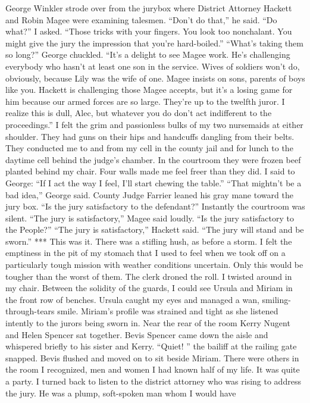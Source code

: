 \documentclass{novel}
\begin{document}
\begin{ChapterStart}

\vspace{3\nbs}
\end{ChapterStart}


George Winkler strode over from the jurybox where District Attorney Hackett and Robin Magee were examining talesmen. “Don’t do that,” he said. “Do what?” I asked. “Those tricks with your fingers. You look too nonchalant. You might give the jury the impression that you’re hard-boiled.” “What’s taking them so long?” George chuckled. “It’s a delight to see Magee work. He’s challenging everybody who hasn’t at least one son in the service. Wives of soldiers won’t do, obviously, because Lily was the wife of one. Magee insists on sons, parents of boys like you. Hackett is challenging those Magee accepts, but it’s a losing game for him because our armed forces are so large. They’re up to the twelfth juror. I realize this is dull, Alec, but whatever you do don’t act indifferent to the proceedings.” I felt the grim and passionless bulks of my two nursemaids at either shoulder. They had guns on their hips and handcuffs dangling from their belts. They conducted me to and from my cell in the county jail and for lunch to the daytime cell behind the judge’s chamber. In the courtroom they were frozen beef planted behind my chair. Four walls made me feel freer than they did. I said to George: “If I act the way I feel, I’ll start chewing the table.” “That mightn’t be a bad idea,” George said. County Judge Farrier leaned his gray mane toward the jury box. “Is the jury satisfactory to the defendant?” Instantly the courtroom was silent. “The jury is satisfactory,” Magee said loudly. “Is the jury satisfactory to the People?” “The jury is satisfactory,” Hackett said. “The jury will stand and be sworn.” *** This was it. There was a stifling hush, as before a storm. I felt the emptiness in the pit of my stomach that I used to feel when we took off on a particularly tough mission with weather conditions uncertain. Only this would be tougher than the worst of them. The clerk droned the roll. I twisted around in my chair. Between the solidity of the guards, I could see Ursula and Miriam in the front row of benches. Ursula caught my eyes and managed a wan, smiling-through-tears smile. Miriam’s profile was strained and tight as she listened intently to the jurors being sworn in. Near the rear of the room Kerry Nugent and Helen Spencer sat together. Bevis Spencer came down the aisle and whispered briefly to his sister and Kerry. “Quiet! ” the bailiff at the railing gate snapped. Bevis flushed and moved on to sit beside Miriam. There were others in the room I recognized, men and women I had known half of my life. It was quite a party. I turned back to listen to the district attorney who was rising to address the jury. He was a plump, soft-spoken man whom I would have 
\end{document}
